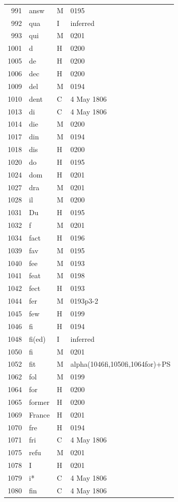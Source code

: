 \begin{longtable}{@{}rlll@{}}
991 & answ & M & 0195 \\
992 & qua & I & inferred \\
993 & qui & M & 0201 \\
1001 & d & H & 0200 \\
1005 & de & H & 0200 \\
1006 & dec & H & 0200 \\
1009 & del & M & 0194 \\
1010 & dent & C & 4 May 1806 \\
1013 & di & C & 4 May 1806 \\
1014 & die & M & 0200 \\
1017 & din & M & 0194 \\
1018 & dis & H & 0200 \\
1020 & do & H & 0195 \\
1024 & dom & H & 0201 \\
1027 & dra & M & 0201 \\
1028 & il & M & 0200 \\
1031 & Du & H & 0195 \\
1032 & f & M & 0201 \\
1034 & fact & H & 0196 \\
1039 & fav & M & 0195 \\
1040 & fee & M & 0193 \\
1041 & feat & M & 0198 \\
1042 & fect & H & 0193 \\
1044 & fer & M & 0193p3-2 \\
1045 & few & H & 0199 \\
1046 & fi & H & 0194 \\
1048 & fi(ed) & I & inferred \\
1050 & fi & M & 0201 \\
1052 & fit & M & alpha(1046fi,1050fi,1064for)+PS \\
1062 & fol & M & 0199 \\
1064 & for & H & 0200 \\
1065 & former & H & 0200 \\
1069 & France & H & 0201 \\
1070 & fre & H & 0194 \\
1071 & fri & C & 4 May 1806 \\
1075 & refu & M & 0201 \\
1078 & I & H & 0201 \\
1079 & i* & C & 4 May 1806 \\
1080 & fin & C & 4 May 1806 \\

\end{longtable}

